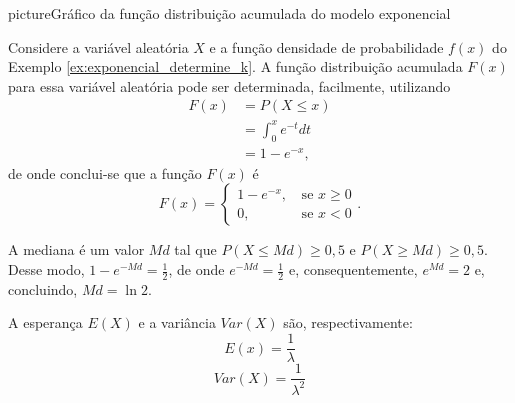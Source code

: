 \documentclass[11pt,fleqn]{book}
\numberwithin{mpicture}{chapter}
\numberwithin{mtable}{chapter}
\numberwithin{mframe}{chapter}
\begin{document}
\begin{sidepicture}{0cm}{picture}{Gráfico da função distribuição acumulada do modelo exponencial}
	\label{fig:cap0:modelo_exponencial_acumulada}
\end{sidepicture}

\begin{example}
	Considere a variável aleatória $X$ e a função densidade de probabilidade $f(x)$ do Exemplo \ref{ex:exponencial_determine_k}. A função distribuição acumulada $F(x)$ para essa variável aleatória pode ser determinada, facilmente, utilizando
	\begin{align*}
		F(x)&=P(X\leqslant x)\\
			&=\int_{0}^{x}e^{-t}dt\\
			&=1-e^{-x}\text{,}
	\end{align*}
	de onde conclui-se que a função $F(x)$ é
	\[
		F(x)=\begin{cases}
			1-e^{-x}\text{,}&\text{ se } x \geqslant 0\\
			0\text{,}&\text{ se } x < 0
		\end{cases}
		\text{.}
	\]
	
	A mediana é um valor $Md$ tal que $P(X\leqslant Md)\geqslant 0,5$ e $P(X\geqslant Md)\geqslant 0,5$. Desse modo, $1-e^{-Md}=\frac{1}{2}$, de onde $e^{-Md}=\frac{1}{2}$ e, consequentemente, $e^{Md}=2$ e, concluindo, $Md=\ln 2$.
\end{example}

A esperança $E(X)$ e a variância $Var(X)$ são, respectivamente:
\begin{equation}
	E(x)=\frac{1}{\lambda}
\end{equation}
\begin{equation}
	Var(X)=\frac{1}{\lambda^2}
\end{equation}
\end{document}
